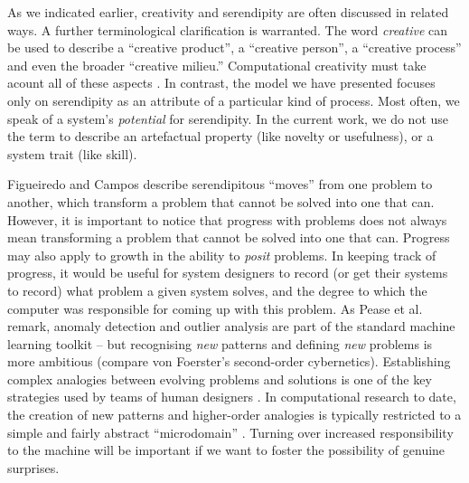 As we indicated earlier, creativity and serendipity are often
discussed in related ways.  A further terminological clarification is
warranted.  The word \emph{creative} can be used to describe a
``creative product'', a ``creative person'', a ``creative process''
and even the broader ``creative milieu.''  Computational creativity
must take acount all of these aspects \cite{jordanous2016four}.  In
contrast, the model we have presented focuses only on serendipity as
an attribute of a particular kind of process.  Most often, we speak of
a system's \emph{potential} for serendipity.  In the current work, we
do not use the term to describe an artefactual property (like novelty
or usefulness), or a system trait (like skill).

Figueiredo and Campos \cite{Figueiredo2001} describe serendipitous ``moves'' from one
problem to another, which transform a problem that cannot be solved
into one that can.  
However, it is important to notice that progress with problems does not always mean transforming a
problem that cannot be solved into one that can.  Progress may also
apply to growth in the ability to \emph{posit} problems.  In keeping
track of progress, it would be useful for system designers to record
(or get their systems to record) what problem a given system solves,
and the degree to which the computer was responsible for coming up
with this problem.
%
As Pease et al. \cite[p. 69]{pease2013discussion} remark,
anomaly detection and outlier analysis are part of the standard
machine learning toolkit -- but recognising \emph{new} patterns and
defining \emph{new} problems is more ambitious (compare von Foerster's
\cite{von2003cybernetics} second-order cybernetics). 
Establishing complex analogies between evolving problems and solutions
is one of the key strategies used by teams of human designers
\cite{Analogical-problem-evolution-DCC}.  In computational research to
date, the creation of new patterns and higher-order analogies is
typically restricted to a simple and fairly abstract ``microdomain''
\cite{hofstadter1994copycat,DBLP:journals/jetai/Marshall06}.
%
Turning over increased responsibility to the machine will be important
if we want to foster the possibility of genuine surprises.

